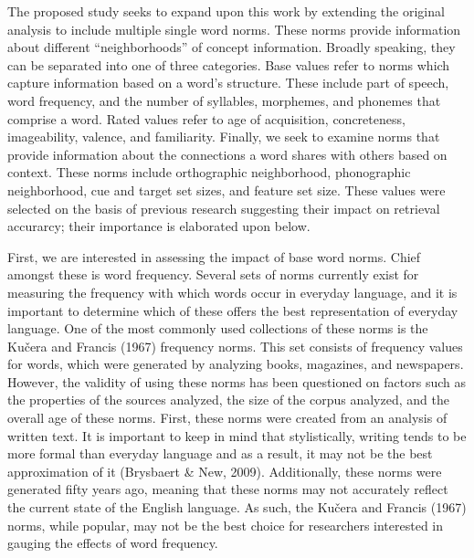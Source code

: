 \documentclass[english,man]{apa6}
\theoremstyle{definition}
\theoremstyle{definition}
\theoremstyle{definition}
\theoremstyle{remark}
\begin{document}
The proposed study seeks to expand upon this work by extending the
original analysis to include multiple single word norms. These norms
provide information about different \enquote{neighborhoods} of concept
information. Broadly speaking, they can be separated into one of three
categories. Base values refer to norms which capture information based
on a word's structure. These include part of speech, word frequency, and
the number of syllables, morphemes, and phonemes that comprise a word.
Rated values refer to age of acquisition, concreteness, imageability,
valence, and familiarity. Finally, we seek to examine norms that provide
information about the connections a word shares with others based on
context. These norms include orthographic neighborhood, phonographic
neighborhood, cue and target set sizes, and feature set size. These
values were selected on the basis of previous research suggesting their
impact on retrieval accurarcy; their importance is elaborated upon
below.

First, we are interested in assessing the impact of base word norms.
Chief amongst these is word frequency. Several sets of norms currently
exist for measuring the frequency with which words occur in everyday
language, and it is important to determine which of these offers the
best representation of everyday language. One of the most commonly used
collections of these norms is the Kučera and Francis (1967) frequency
norms. This set consists of frequency values for words, which were
generated by analyzing books, magazines, and newspapers. However, the
validity of using these norms has been questioned on factors such as the
properties of the sources analyzed, the size of the corpus analyzed, and
the overall age of these norms. First, these norms were created from an
analysis of written text. It is important to keep in mind that
stylistically, writing tends to be more formal than everyday language
and as a result, it may not be the best approximation of it (Brysbaert
\& New, 2009). Additionally, these norms were generated fifty years ago,
meaning that these norms may not accurately reflect the current state of
the English language. As such, the Kučera and Francis (1967) norms,
while popular, may not be the best choice for researchers interested in
gauging the effects of word frequency.
\end{document}
